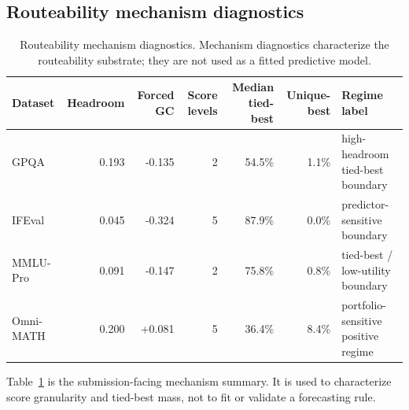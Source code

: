 \documentclass{article}
\begin{document}
\subsection{Routeability mechanism diagnostics}

\begin{table}[h]
  \caption{Routeability mechanism diagnostics. Mechanism diagnostics characterize the routeability substrate; they are not used as a fitted predictive model.}
  \label{tab:app-mechanism-diagnostics}
  \centering
  \scriptsize
  \begin{tabular}{lrrrrrl}
    \toprule
    Dataset & Headroom & Forced GC & Score levels & Median tied-best & Unique-best & Regime label \\
    \midrule
    GPQA & 0.193 & -0.135 & 2 & 54.5\% & 1.1\% & high-headroom tied-best boundary \\
    IFEval & 0.045 & -0.324 & 5 & 87.9\% & 0.0\% & predictor-sensitive boundary \\
    MMLU-Pro & 0.091 & -0.147 & 2 & 75.8\% & 0.8\% & tied-best / low-utility boundary \\
    Omni-MATH & 0.200 & +0.081 & 5 & 36.4\% & 8.4\% & portfolio-sensitive positive regime \\
    \bottomrule
  \end{tabular}
\end{table}

Table~\ref{tab:app-mechanism-diagnostics} is the submission-facing mechanism summary. It is used to characterize score granularity and tied-best mass, not to fit or validate a forecasting rule.
\end{document}
